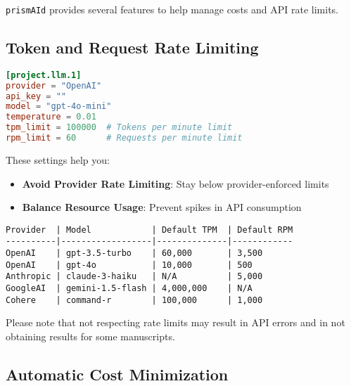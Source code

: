 \texttt{prismAId} provides several features to help manage costs and API rate limits.

\subsection{Token and Request Rate Limiting}

\begin{configbox}
\begin{lstlisting}[language=TOML]
[project.llm.1]
provider = "OpenAI"
api_key = ""
model = "gpt-4o-mini"
temperature = 0.01
tpm_limit = 100000  # Tokens per minute limit
rpm_limit = 60      # Requests per minute limit
\end{lstlisting}
\end{configbox}

These settings help you:
\begin{itemize}
    \item \textbf{Avoid Provider Rate Limiting}: Stay below provider-enforced limits
    \item \textbf{Balance Resource Usage}: Prevent spikes in API consumption
\end{itemize}

\begin{commandbox}
\begin{lstlisting}
Provider  | Model            | Default TPM  | Default RPM
----------|------------------|--------------|------------
OpenAI    | gpt-3.5-turbo    | 60,000       | 3,500
OpenAI    | gpt-4o           | 10,000       | 500
Anthropic | claude-3-haiku   | N/A          | 5,000
GoogleAI  | gemini-1.5-flash | 4,000,000    | N/A
Cohere    | command-r        | 100,000      | 1,000
\end{lstlisting}
\end{commandbox}

Please note that not respecting rate limits may result in API errors and in not obtaining results for some manuscripts.

\subsection{Automatic Cost Minimization}

